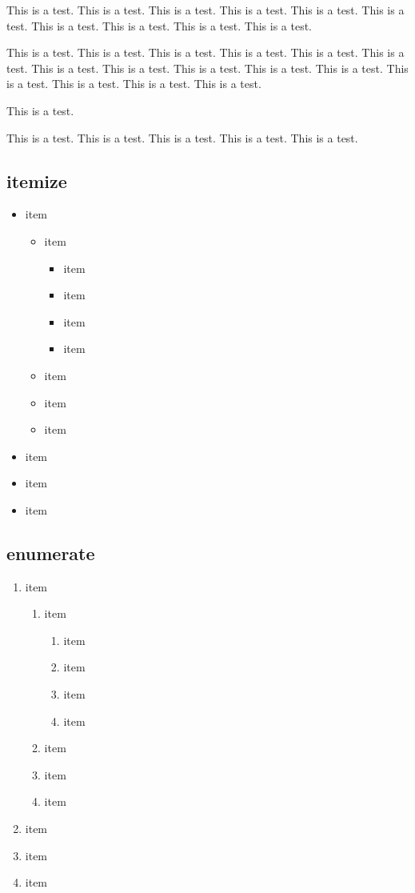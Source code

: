 \documentclass[twoside]{article}
\begin{document}
This is a test.
This is a test.
This is a test.
This is a test.
This is a test.
This is a test.
This is a test.
This is a test.
This is a test.
This is a test.

This is a test.
This is a test.
This is a test.
This is a test.
This is a test.
This is a test.
This is a test.
This is a test.
This is a test.
This is a test.
This is a test.
This is a test.
This is a test.
This is a test.
This is a test.

This is a test.

This is a test.
This is a test.
This is a test.
This is a test.
This is a test.

\subsection{itemize}
\begin{itemize}
\item item
	\begin{itemize}
	\item item
		\begin{itemize}
		\item item
		\item item
		\item item
		\item item
		\end{itemize}
	\item item
	\item item
	\item item
	\end{itemize}
\item item
\item item
\item item

\end{itemize}

\subsection{enumerate}
\begin{enumerate}
\item item
	\begin{enumerate}
	\item item
		\begin{enumerate}
		\item item
		\item item
		\item item
		\item item
		\end{enumerate}
	\item item
	\item item
	\item item
	\end{enumerate}
\item item
\item item
\item item
\end{enumerate}
\end{document}
